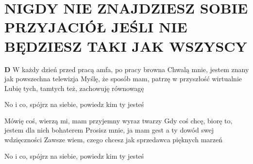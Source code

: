 \documentclass[../../../songbook.tex]{subfiles}
\begin{document}
\TabPositions{9cm} %
\section*{NIGDY NIE ZNAJDZIESZ SOBIE PRZYJACIÓŁ JEŚLI NIE BĘDZIESZ TAKI JAK WSZYSCY}
{}
\vspace{0.5cm}
{\color{red}\textbf{D} } \newline \newline
W każdy dzień przed pracą amfa, po pracy browna		  \newline
Chwalą mnie, jestem znany jak powszechna telewizja	 \newline
Myślę, że sposób mam, patrzę w przyszłość wirtualnie	 \newline
Lubię tych, tamtych też, zachowuję równowagę	 \newline

\-\hspace{1cm} No i co, spójrz na siebie, powiedz kim ty jesteś  \newline

Mówię coś, wierzą mi, mam przyjemny wyraz twarzy	 \newline
Gdy coś chcę, biorę to, jestem dla nich bohaterem	 \newline
Prosisz mnie, ja mam gest a ty dowód swej wdzięczności	 \newline
Zawsze wiem, czego chcesz jak sprzedawca pięknych marzeń	 \newline

\-\hspace{1cm} No i co, spójrz na siebie, powiedz kim ty jesteś	 \newline
\end{document}
